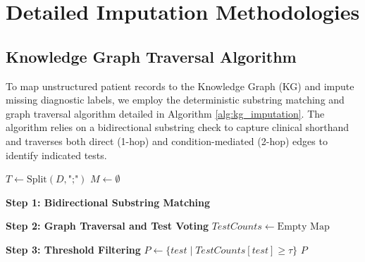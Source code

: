 \documentclass[pmlr]{jmlr}%
\begin{document}
\section{Detailed Imputation Methodologies}

\subsection*{Knowledge Graph Traversal Algorithm}
\label{app:kg_matching}
To map unstructured patient records to the Knowledge Graph (KG) and impute missing diagnostic labels, we employ the deterministic substring matching and graph traversal algorithm detailed in Algorithm \ref{alg:kg_imputation}. The algorithm relies on a bidirectional substring check to capture clinical shorthand and traverses both direct (1-hop) and condition-mediated (2-hop) edges to identify indicated tests.

\begin{algorithm}[htbp]
\caption{Knowledge Graph Entity Matching and Test Imputation}
\label{alg:kg_imputation}

$T \gets \text{Split}(D, \text{";"})$ 
$M \gets \emptyset$ 

\BlankLine
\textbf{Step 1: Bidirectional Substring Matching}\;

\BlankLine
\textbf{Step 2: Graph Traversal and Test Voting}\;
$TestCounts \gets \text{Empty Map}$ 


\BlankLine
\textbf{Step 3: Threshold Filtering}\;
$P \gets \{test \mid TestCounts[test] \ge \tau\}$\;
\Return $P$\;
\end{algorithm}
\end{document}
